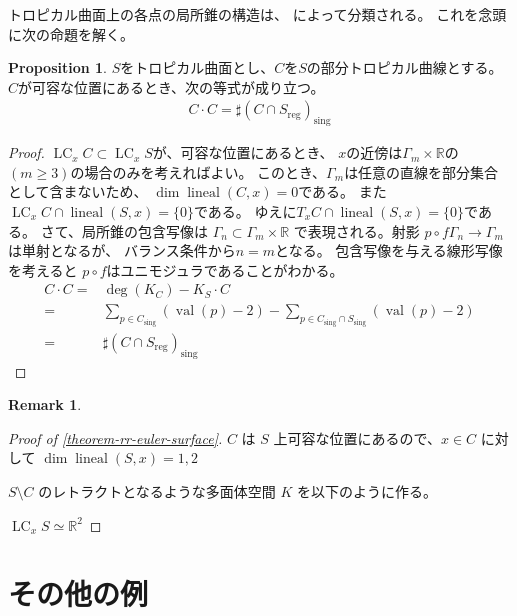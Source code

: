 \documentclass[a4paper,dvipdfmx,reqno,12pt]{amsart}
\theoremstyle{definition}
\newtheorem{proposition}[theorem]{Proposition}
\newtheorem{remark}[theorem]{Remark}
\newcommand{\opn}[1]{\operatorname{#1}}
\numberwithin{equation}{section}
\begin{document}
トロピカル曲面上の各点の局所錐の構造は、
\cite[Corollary 2.4]{shaw2015tropical}
によって分類される。
これを念頭に次の命題を解く。
\begin{proposition}
$S$をトロピカル曲面とし、$C$を$S$の部分トロピカル曲線とする。
$C$が可容な位置にあるとき、次の等式が成り立つ。
\begin{align}
     C\cdot C=\sharp (C\cap S_{\mathrm{reg}})_{\mathrm{sing}}
\end{align}
\end{proposition}
\begin{proof}
$\opn{LC}_x C\subset \opn{LC}_x S$が、可容な位置にあるとき、
$x$の近傍は$\Gamma_m\times \mathbb{R}$の
$(m\geq 3)$の場合のみを考えればよい。
このとき、$\Gamma_m$は任意の直線を部分集合として含まないため、
$\dim \opn{lineal}(C,x)=0$である。
また$\opn{LC}_x C\cap \opn{lineal}(S,x)=\{0\}$である。
ゆえに$T_x C\cap \opn{lineal}(S,x)=\{0\}$である。
さて、局所錐の包含写像は
$\Gamma_{n}\subset \Gamma_m\times \mathbb{R}$
で表現される。射影 $p\circ f\Gamma_n\to \Gamma_m$は単射となるが、
バランス条件から$n=m$となる。
包含写像を与える線形写像を考えると
$p\circ f$はユニモジュラであることがわかる。
\begin{align}
C\cdot C=&\opn{deg}(K_C)-K_S\cdot C \\
=& \sum_{p\in C_{\mathrm{sing}}}(\opn{val}(p)-2)
- \sum_{p\in C_{\mathrm{sing}}\cap S_{\mathrm{sing}}}
(\opn{val}(p)-2) \\
=& \sharp (C\cap S_{\mathrm{reg}})_{\mathrm{sing}}
\end{align}

\end{proof}

\begin{remark}
     
\end{remark}

\begin{proof}[{Proof of \cref{theorem-rr-euler-surface}}]

$C$ は $S$ 上可容な位置にあるので、$x\in C$
に対して $\dim \opn{lineal}(S,x)=1,2$

$S\setminus C$ のレトラクトとなるような多面体空間
$K$ を以下のように作る。


$\opn{LC}_x S\simeq \mathbb{R}^{2}$

\end{proof}

\section{その他の例}
\end{document}
